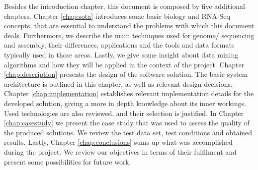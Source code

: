 Besides the introduction chapter, this document is composed by five additional
chapters. Chapter \ref{chap:sota} introduces some basic biology and RNA-Seq
concepts, that are essential to understand the problems with which this document
deals. Furthermore, we describe the main techniques used for genome/\trans{}
sequencing and assembly, their differences, applications and the tools and data
formats typically used in those areas. Lastly, we give some insight about data
mining algorithms and how they will be applied in the context of the project.
Chapter \ref{chap:description} presents the design of the software solution. The
basic system architecture is outlined in this chapter, as well as relevant design
decisions. Chapter \ref{chap:implementation} establishes relevant implementation
details for the developed solution, giving a more in depth knowledge about its
inner workings. Used technologies are also reviewed, and their selection is
justified. In Chapter \ref{chap:casestudy} we present the case study that was
used to assess the quality of the produced solutions. We review the test data
set, test conditions and obtained results. Lastly, Chapter
\ref{chap:conclusions} sums up what was accomplished during the project. We
review our objectives in terms of their fulfilment and present some
possibilities for future work.
